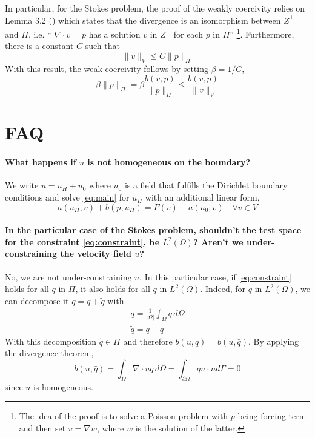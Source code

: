 \documentclass[a4paper,10pt]{article}
\begin{document}
  In particular, for the Stokes problem, the proof of the weakly coercivity relies on Lemma 3.2 (\cite{girault2012finite}) which states that the divergence is an isomorphism between $Z^\perp$ and $\Pi$, i.e. `` $\nabla \cdot v =p$ has a solution $v$ in $Z^\perp$ for each $p$ in $\Pi$'' \footnote{The idea of the proof is to solve a Poisson problem with $p$ being forcing term and then set $v= \nabla w$, where $w$ is the solution of the latter.}. Furthermore, there is a constant $C$ such that
  \begin{equation}
   \|v\|_V \leq C \|p\|_\Pi
  \end{equation}
  With this result, the weak coercivity follows by setting $\beta = 1/C$,
  \begin{equation}
  \beta \|p\|_\Pi = \beta\frac{b(v,p)}{\|p\|_\Pi} \leq \frac{b(v,p)}{\|v\|_V}
  \end{equation}
  
  \section*{FAQ}
  \paragraph{What happens if $u$ is not homogeneous on the boundary?}
  
  We write $u = u_H + u_0$ where $u_0$ is a field that fulfills the Dirichlet boundary conditions and solve \cref{eq:main} for $u_H$ with an additional linear form,
  \begin{equation}
   a(u_H,v) + b(p,u_H) = F(v) - a(u_0,v) \quad \forall v \in V
  \end{equation}

  \paragraph{In the particular case of the Stokes problem, shouldn't the test space for the constraint \cref{eq:constraint}, be $L^2(\Omega)$? Aren't we under-constraining the velocity field $u$?}
  No, we are not under-constraining $u$. In this particular case, if \cref{eq:constraint} holds for all $q$ in $\Pi$, it also holds for all $q$ in $L^2(\Omega)$. Indeed, for $q$ in $L^2(\Omega)$, we can decompose it $q = \bar{q}+\tilde{q}$ with
  \begin{gather*}
   \bar{q}   = \frac{1}{|\Omega|} \int_\Omega q \,d\Omega\\
   \tilde{q} = q-\bar{q}
  \end{gather*}
  With this decomposition $\tilde{q} \in \Pi$ and therefore $b(u,q) = b(u,\bar{q})$. By applying the divergence theorem,
  \begin{equation}
   b(u,\bar{q}) = \int_\Omega \nabla \cdot u q \,d\Omega = \int_{\partial \Omega} q u \cdot n d\Gamma = 0
  \end{equation}
  since $u$ is homogeneous.
  
 
\end{document}
